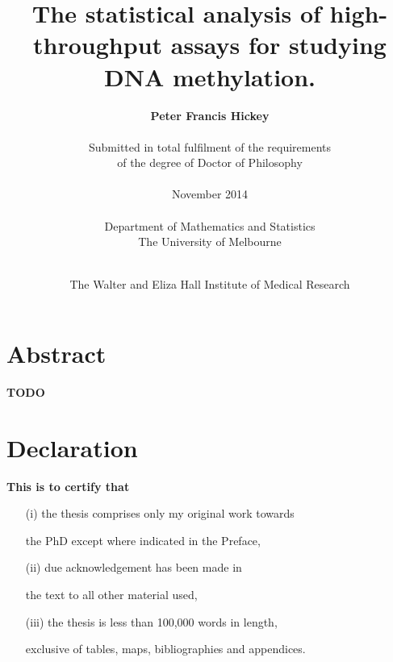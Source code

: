 \documentclass[11pt,a4paper,oneside]{book}	%
\begin{document}


\title{\huge \bf The statistical analysis of high-throughput assays
for studying DNA methylation.\\}

\author{{\bf \Large Peter Francis Hickey}\\\\
Submitted in total fulfilment of the requirements\\
of the degree of Doctor of Philosophy\\\\
November 2014\\\\
Department of Mathematics and Statistics\\
The University of Melbourne\\\\}

\date{The Walter and Eliza Hall Institute of Medical Research}

\maketitle

\frontmatter

\chapter{Abstract}


\textbf{TODO}


\chapter{Declaration}

{\bf This is to certify that}

\begin{itemize}

\item [(i)] the thesis comprises only my original work towards

the PhD except where indicated in the Preface,

\item [(ii)] due acknowledgement has been made in

the text to all other material used,

\item [(iii)] the thesis is less than 100,000 words in length,

exclusive of tables, maps, bibliographies and appendices.

\end{itemize}
\end{document}
